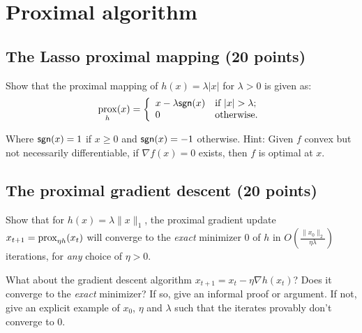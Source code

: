 \newpage
\section{Proximal algorithm}

\subsection{The Lasso proximal mapping (20 points)}
Show that the proximal mapping of $h(x) = \lambda | x |$ for $\lambda > 0$ is given as:
$$\operatorname*{prox}_{h}(x) = \left\{ \begin{array}{ll}
         x - \lambda \mathsf{sgn}(x) & \mbox{if $|x|  > \lambda$};\\
        0 & \mbox{otherwise}.\end{array} \right. $$

Where $\mathsf{sgn}(x) = 1$ if $x \geq 0$ and $\mathsf{sgn}(x)= -1$ otherwise.  Hint: Given $f$ convex but not necessarily differentiable, if $\nabla f(x)=0$ exists, then $f$ is optimal at $x$.


\subsection{The  proximal gradient descent (20 points)}
Show that for $h(x) = \lambda \| x \|_1$, the proximal gradient update $x_{t + 1} = \operatorname*{prox}_{\eta h}(x_t) $ will converge to the \emph{exact} minimizer $0$ of $h$ in $O\left( \frac{\|x_0 \|_2}{\eta \lambda} \right)$ iterations, for \emph{any} choice of $\eta > 0$. 


What about the gradient descent algorithm $x_{t + 1} = x_t - \eta \nabla h(x_t)$? Does it converge to the  \emph{exact} minimizer? If so, give an informal proof or argument. If not, give an explicit example of $x_0$, $\eta$ and $\lambda$ such that the iterates provably don't converge to $0$. 


 
